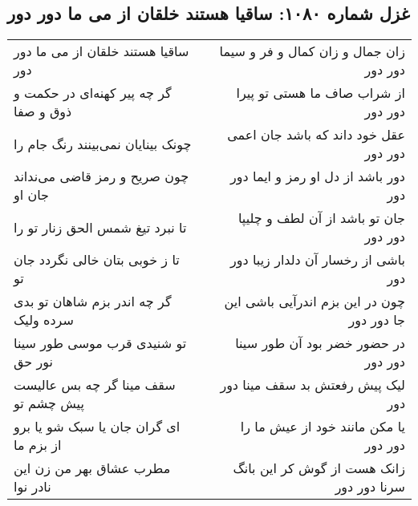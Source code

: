 \begin{center}
\section*{غزل شماره ۱۰۸۰: ساقیا هستند خلقان از می ما دور دور}
\label{sec:1080}
\begin{longtable}{l p{0.5cm} r}
ساقیا هستند خلقان از می ما دور دور
&&
زان جمال و زان کمال و فر و سیما دور دور
\\
گر چه پیر کهنه‌ای در حکمت و ذوق و صفا
&&
از شراب صاف ما هستی تو پیرا دور دور
\\
چونک بینایان نمی‌بینند رنگ جام را
&&
عقل خود داند که باشد جان اعمی دور دور
\\
چون صریح و رمز قاضی می‌نداند جان او
&&
دور باشد از دل او رمز و ایما دور دور
\\
تا نبرد تیغ شمس الحق زنار تو را
&&
جان تو باشد از آن لطف و چلیپا دور دور
\\
تا ز خوبی بتان خالی نگردد جان تو
&&
باشی از رخسار آن دلدار زیبا دور دور
\\
گر چه اندر بزم شاهان تو بدی سرده ولیک
&&
چون در این بزم اندرآیی باشی این جا دور دور
\\
تو شنیدی قرب موسی طور سینا نور حق
&&
در حضور خضر بود آن طور سینا دور دور
\\
سقف مینا گر چه بس عالیست پیش چشم تو
&&
لیک پیش رفعتش بد سقف مینا دور دور
\\
ای گران جان یا سبک شو یا برو از بزم ما
&&
یا مکن مانند خود از عیش ما را دور دور
\\
مطرب عشاق بهر من زن این نادر نوا
&&
زانک هست از گوش کر این بانگ سرنا دور دور
\\
\end{longtable}
\end{center}
